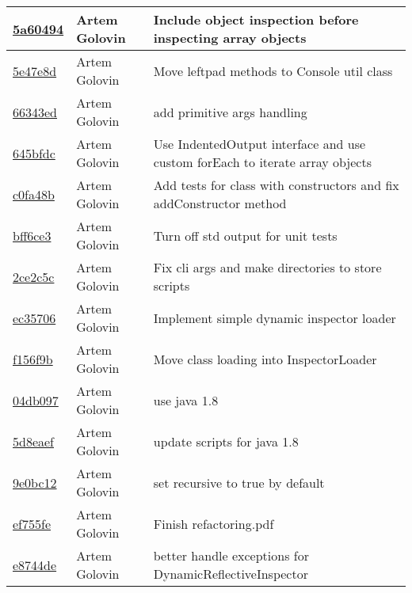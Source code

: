 \begin{tabularx}{\textwidth}{l l X}
\href{https://github.com/awave1/ObjectInspector/commit/5a60494c178ae449c73b64573945d738fa660fbc}{5a60494} & Artem Golovin & Include object inspection before inspecting array objects\\ \hline
\href{https://github.com/awave1/ObjectInspector/commit/5e47e8d3c80ca582c40d589319183ff8bbc04975}{5e47e8d} & Artem Golovin & Move leftpad methods to Console util class\\ \hline
\href{https://github.com/awave1/ObjectInspector/commit/66343ed9e306d8d95fc154743233476df9d8e01b}{66343ed} & Artem Golovin & add primitive args handling\\ \hline
\href{https://github.com/awave1/ObjectInspector/commit/645bfdce0ecb6be66d752fd30a505777d78f0cc4}{645bfdc} & Artem Golovin & Use IndentedOutput interface and use custom forEach to iterate array objects\\ \hline
\href{https://github.com/awave1/ObjectInspector/commit/c0fa48ba955e0b6b2a3a5b4cea0799a48608cd52}{c0fa48b} & Artem Golovin & Add tests for class with constructors and fix addConstructor method\\ \hline
\href{https://github.com/awave1/ObjectInspector/commit/bff6ce3c5e65af191b41dbea9ac64098c79f8d77}{bff6ce3} & Artem Golovin & Turn off std output for unit tests\\ \hline
\href{https://github.com/awave1/ObjectInspector/commit/2ce2c5cbcab69a44628f32983d441161834f1c94}{2ce2c5c} & Artem Golovin & Fix cli args and make directories to store scripts\\ \hline
\href{https://github.com/awave1/ObjectInspector/commit/ec357060b553399d386e08a757cf66dfdc4cd7a8}{ec35706} & Artem Golovin & Implement simple dynamic inspector loader\\ \hline
\href{https://github.com/awave1/ObjectInspector/commit/f156f9b121be09cd64888343984a15e279719ded}{f156f9b} & Artem Golovin & Move class loading into InspectorLoader\\ \hline
\href{https://github.com/awave1/ObjectInspector/commit/04db097989e2c8f71446b8f012f509a6132645c8}{04db097} & Artem Golovin & use java 1.8\\ \hline
\href{https://github.com/awave1/ObjectInspector/commit/5d8eaeff2d1d2ee2cce366d225657b37b16ae0fd}{5d8eaef} & Artem Golovin & update scripts for java 1.8\\ \hline
\href{https://github.com/awave1/ObjectInspector/commit/9e0bc1287fc27e5ed1d0be29bcf8d116e50d972a}{9e0bc12} & Artem Golovin & set recursive to true by default\\ \hline
\href{https://github.com/awave1/ObjectInspector/commit/ef755fe5a97445bba3121a3a69ac2069f66994cc}{ef755fe} & Artem Golovin & Finish refactoring.pdf\\ \hline
\href{https://github.com/awave1/ObjectInspector/commit/e8744de8105b6dff68749c4eb2c155bf2f6bf3c6}{e8744de} & Artem Golovin & better handle exceptions for DynamicReflectiveInspector\\ \hline
\end{tabularx}
